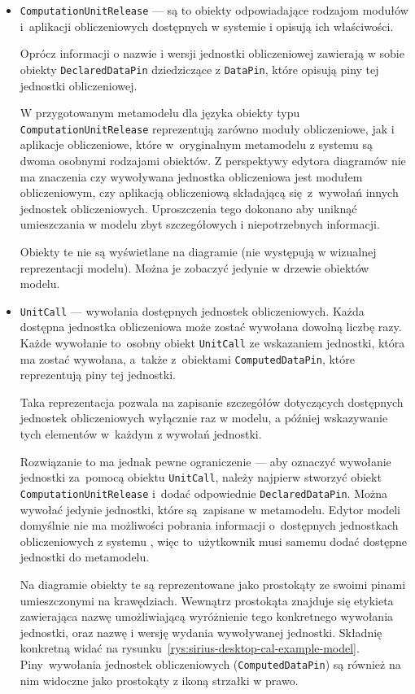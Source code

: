 \begin{itemize}
	\item \texttt{ComputationUnitRelease} --- są to obiekty odpowiadające
	      rodzajom modułów i~aplikacji obliczeniowych dostępnych w systemie \BalticLSC{} i opisują ich właściwości.

	      Oprócz informacji o nazwie i wersji jednostki obliczeniowej zawierają w sobie obiekty \texttt{DeclaredDataPin} dziedziczące z \texttt{DataPin}, które opisują piny tej jednostki obliczeniowej.

	      W przygotowanym metamodelu dla języka \CAL{} obiekty typu \texttt{ComputationUnitRelease} reprezentują zarówno moduły obliczeniowe, jak i aplikacje obliczeniowe, które w~oryginalnym metamodelu z systemu \BalticLSC{} są dwoma osobnymi rodzajami obiektów. Z perspektywy edytora diagramów nie ma znaczenia czy wywoływana jednostka obliczeniowa jest modułem obliczeniowym, czy aplikacją obliczeniową składającą się~z~wywołań innych jednostek obliczeniowych. Uproszczenia tego dokonano aby uniknąć umieszczania w modelu zbyt szczegółowych i niepotrzebnych informacji.

	      Obiekty te nie są wyświetlane na diagramie (nie występują w wizualnej reprezentacji modelu). Można je zobaczyć jedynie w drzewie obiektów modelu.

	\item \texttt{UnitCall} --- wywołania dostępnych jednostek
	      obliczeniowych. Każda dostępna jednostka obliczeniowa może zostać wywołana dowolną liczbę razy. Każde wywołanie to~osobny obiekt \texttt{UnitCall} ze wskazaniem jednostki, która ma zostać wywołana, a~także z~obiektami \texttt{ComputedDataPin}, które reprezentują piny tej jednostki.

	      Taka reprezentacja pozwala na zapisanie szczegółów dotyczących dostępnych jednostek obliczeniowych wyłącznie raz w modelu, a później wskazywanie tych elementów w~każdym z wywołań jednostki.

	      Rozwiązanie to ma jednak pewne ograniczenie --- aby oznaczyć wywołanie jednostki za~pomocą obiektu \texttt{UnitCall}, należy najpierw stworzyć obiekt \texttt{Computation\-Unit\-Release} i~dodać odpowiednie \texttt{Declared\-Data\-Pin}. Można wywołać jedynie jednostki, które są~zapisane w metamodelu. Edytor modeli domyślnie nie ma możliwości pobrania informacji o~dostępnych jednostkach obliczeniowych z systemu \BalticLSC{}, więc to~użytkownik musi samemu dodać dostępne jednostki do metamodelu.

	      Na diagramie obiekty te są reprezentowane jako prostokąty ze swoimi pinami umieszczonymi na krawędziach. Wewnątrz prostokąta znajduje się etykieta zawierająca nazwę umożliwiającą wyróżnienie tego konkretnego wywołania jednostki, oraz nazwę i wersję wydania wywoływanej jednostki. Składnię konkretną widać na rysunku~\ref{rys:sirius-desktop-cal-example-model}. Piny~wywołania jednostek obliczeniowych (\texttt{ComputedDataPin}) są również na nim widoczne jako prostokąty z ikoną strzałki w prawo.


\end{itemize}
